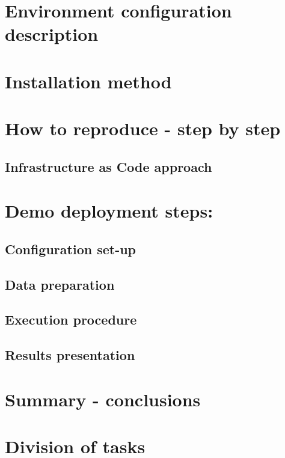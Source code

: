 \documentclass{article}
\begin{document}
\section{Environment configuration description}

\section{Installation method}

\section{How to reproduce - step by step}

\subsection{Infrastructure as Code approach}

\section{Demo deployment steps:}

\subsection{Configuration set-up}

\subsection{Data preparation}

\subsection{Execution procedure}

\subsection{Results presentation}

\section{Summary - conclusions}

\section{Division of tasks}
\end{document}

